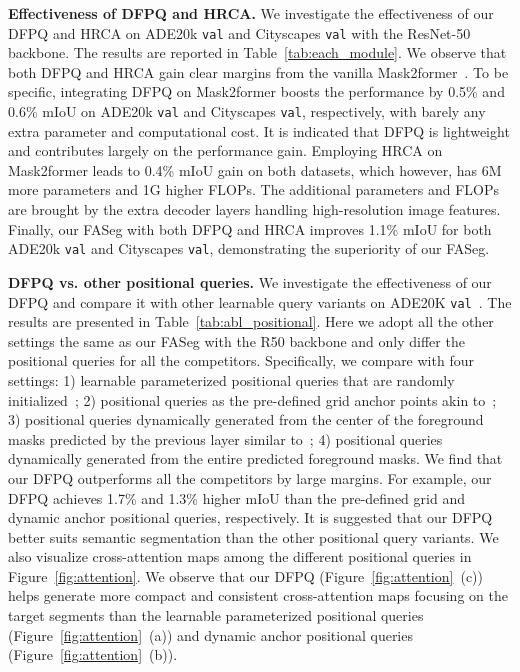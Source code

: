 \noindent\textbf{Effectiveness of DFPQ and HRCA.} We investigate the effectiveness of our DFPQ and HRCA on ADE20k \texttt{val} and Cityscapes \texttt{val} with the ResNet-50 backbone. The results are reported in Table~\ref{tab:each_module}. We observe that both DFPQ and HRCA gain clear margins from the vanilla Mask2former~\cite{cheng2021masked}.
To be specific, integrating DFPQ on Mask2former boosts the performance by 0.5\% and 0.6\% mIoU on ADE20k \texttt{val} and Cityscapes \texttt{val}, respectively, with barely any extra parameter and computational cost. It is indicated that DFPQ is lightweight and contributes largely on the performance gain. Employing HRCA on Mask2former leads to 0.4\% mIoU gain on both datasets, which however, has 6M more parameters and 1G higher FLOPs. The additional parameters and FLOPs are brought by the extra decoder layers handling high-resolution image features. Finally, our FASeg with both DFPQ and HRCA improves 1.1\% mIoU for both ADE20k \texttt{val} and Cityscapes \texttt{val}, demonstrating the superiority of our FASeg.

\noindent\textbf{DFPQ vs. other positional queries.} We investigate the effectiveness of our DFPQ and compare it with other learnable query variants on ADE20K \texttt{val}~\cite{zhou2017scene}. The results are presented in Table~\ref{tab:abl_positional}. Here we adopt all the other settings the same as our FASeg with the R50 backbone and only differ the positional queries for all the competitors. Specifically, we compare with four settings: 1) learnable parameterized positional queries that are randomly initialized~\cite{carion2020end}; 2) positional queries as the pre-defined grid anchor points akin to~\cite{wang2021anchor}; 3) positional queries dynamically generated from the center of the foreground masks predicted by the previous layer similar to~\cite{liu2022dabdetr}; 4) positional queries dynamically generated from the entire predicted foreground masks. We find that our DFPQ outperforms all the competitors by large margins. For example, our DFPQ achieves 1.7\% and 1.3\% higher mIoU than the pre-defined grid and dynamic anchor positional queries, respectively. It is suggested that our DFPQ better suits semantic segmentation than the other positional query variants. We also visualize cross-attention maps among the different positional queries in Figure~\ref{fig:attention}. We observe that our DFPQ (Figure~\ref{fig:attention}~(c)) helps generate more compact and consistent cross-attention maps focusing on the target segments than the learnable parameterized positional queries (Figure~\ref{fig:attention}~(a)) and dynamic anchor positional queries (Figure~\ref{fig:attention}~(b)).

